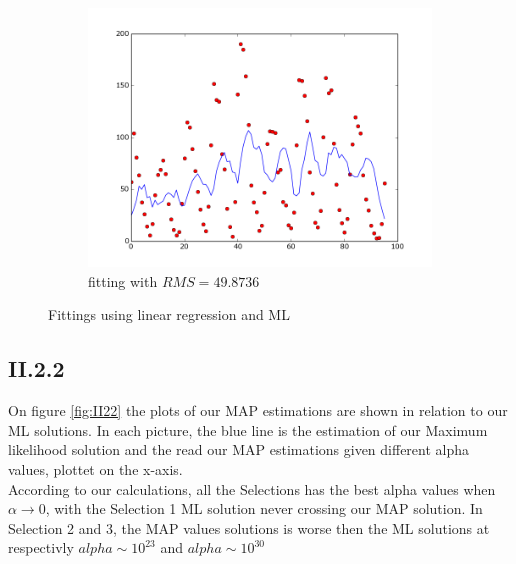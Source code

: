 \documentclass{article}
\begin{document}
\begin{figure}[!ht]
\begin{subfigure}[b]{0.4\textwidth}
        \includegraphics[width=\textwidth]{Part2/II213.png}
        \caption{fitting with $RMS = 49.8736$}
    \end{subfigure}
    \caption{Fittings using linear regression and ML}
    \label{fig:II21}
\end{figure}


\subsection{II.2.2}

On figure \ref{fig:II22} the plots of our MAP estimations are shown in relation
to our ML solutions. In each picture, the blue line is the estimation of
our Maximum likelihood solution and the read our MAP estimations given 
different alpha values, plottet on the x-axis.\\
According to our calculations, all the Selections has the best alpha values
when $\alpha \rightarrow 0$, with the Selection 1 ML solution never crossing 
our MAP solution. In Selection 2 and 3, the MAP values solutions is worse then the
ML solutions at respectivly $alpha \sim 10^{23}$ and $alpha \sim 10^{30}$

\end{document}
